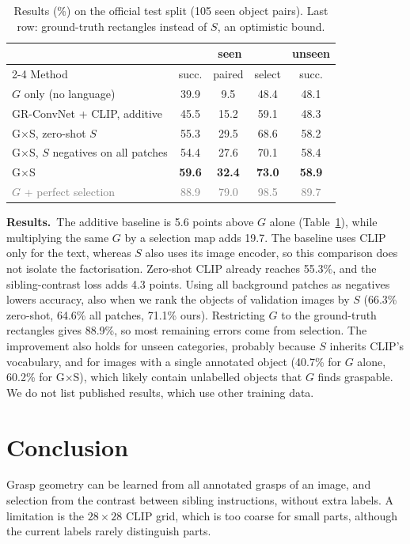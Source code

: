 \documentclass[10pt,twocolumn,letterpaper]{article}
\newcommand{\ours}{G$\times$S\xspace}
\newcommand{\para}[1]{\par\noindent\textbf{#1}\ }
\begin{document}
\begin{table}[t]
\centering\small
\setlength{\tabcolsep}{3.2pt}
\begin{tabular}{lcccc}
\toprule
& \multicolumn{3}{c}{seen} & unseen\\
\cmidrule(lr){2-4}
Method & succ. & paired & select & succ.\\
\midrule
$G$ only (no language) & 39.9 & \phantom{0}9.5 & 48.4 & 48.1\\
GR-ConvNet + CLIP, additive & 45.5 & 15.2 & 59.1 & 48.3\\
\ours, zero-shot $S$ & 55.3 & 29.5 & 68.6 & 58.2\\
\ours, $S$ negatives on all patches & 54.4 & 27.6 & 70.1 & 58.4\\
\ours & \textbf{59.6} & \textbf{32.4} & \textbf{73.0} & \textbf{58.9}\\
\midrule
\textcolor{gray}{$G$ + perfect selection} & \textcolor{gray}{88.9} & \textcolor{gray}{79.0} & \textcolor{gray}{98.5} & \textcolor{gray}{89.7}\\
\bottomrule
\end{tabular}
\caption{Results (\%) on the official test split (105 seen object pairs). Last row: ground-truth
rectangles instead of $S$, an optimistic bound.}
\label{tab:main}
\end{table}

\para{Results.}The additive baseline is 5.6 points above $G$ alone (Table~\ref{tab:main}), while
multiplying the same $G$ by a selection map adds 19.7. The baseline uses CLIP only for the
text, whereas $S$ also uses its image encoder, so this comparison does not isolate the factorisation.
Zero-shot CLIP already reaches 55.3\%, and the sibling-contrast loss adds 4.3 points. Using all
background patches as negatives lowers accuracy, also when we rank the objects of
validation images by $S$ (66.3\% zero-shot, 64.6\% all patches, 71.1\% ours). Restricting $G$
to the ground-truth rectangles gives 88.9\%, so most remaining errors come from selection. The improvement also holds for unseen categories, probably
because $S$ inherits CLIP's vocabulary, and for images with a single annotated object (40.7\% for $G$
alone, 60.2\% for \ours), which likely contain unlabelled objects that $G$ finds graspable. We do not list published results, which use other training data.

\section{Conclusion}
Grasp geometry can be learned from all annotated grasps of an image, and selection from the contrast
between sibling instructions, without extra labels. A limitation is the $28{\times}28$ CLIP grid, which
is too coarse for small parts, although the current labels rarely distinguish parts.

{\footnotesize


}
\end{document}
